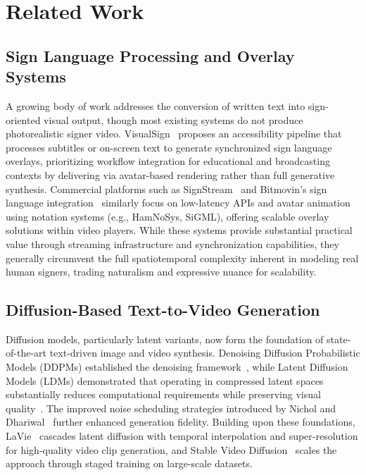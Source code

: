 \documentclass{ieeeaccess}
\begin{document}
\section{Related Work}
\label{sec:related_work}
{\color{blue}%

\subsection{Sign Language Processing and Overlay Systems}

A growing body of work addresses the conversion of written text into sign-oriented visual output, though most existing systems do not produce photorealistic signer video. VisualSign~\cite{springer2024visualsign} proposes an accessibility pipeline that processes subtitles or on-screen text to generate synchronized sign language overlays, prioritizing workflow integration for educational and broadcasting contexts by delivering via avatar-based rendering rather than full generative synthesis. Commercial platforms such as SignStream~\cite{signapse2025signstream} and Bitmovin's sign language integration~\cite{bitmovin2024signlanguage} similarly focus on low-latency APIs and avatar animation using notation systems (e.g., HamNoSys, SiGML), offering scalable overlay solutions within video players. While these systems provide substantial practical value through streaming infrastructure and synchronization capabilities, they generally circumvent the full spatiotemporal complexity inherent in modeling real human signers, trading naturalism and expressive nuance for scalability.

\subsection{Diffusion-Based Text-to-Video Generation}

Diffusion models, particularly latent variants, now form the foundation of state-of-the-art text-driven image and video synthesis. Denoising Diffusion Probabilistic Models (DDPMs) established the denoising framework~\cite{ho2020ddpm}, while Latent Diffusion Models (LDMs) demonstrated that operating in compressed latent spaces substantially reduces computational requirements while preserving visual quality~\cite{rombach2022ldm}. The improved noise scheduling strategies introduced by Nichol and Dhariwal~\cite{nichol2021improved} further enhanced generation fidelity. Building upon these foundations, LaVie~\cite{zhang2023lavie} cascades latent diffusion with temporal interpolation and super-resolution for high-quality video clip generation, and Stable Video Diffusion~\cite{blattmann2023svd} scales the approach through staged training on large-scale datasets.

}
\end{document}
